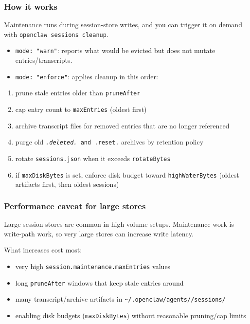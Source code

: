 \subsubsection{How it works}


Maintenance runs during session-store writes, and you can trigger it on demand with \texttt{openclaw sessions cleanup}.

\begin{itemize}
  \item \texttt{mode: "warn"}: reports what would be evicted but does not mutate entries/transcripts.
  \item \texttt{mode: "enforce"}: applies cleanup in this order:
\end{itemize}

\begin{enumerate}
  \item prune stale entries older than \texttt{pruneAfter}
  \item cap entry count to \texttt{maxEntries} (oldest first)
  \item archive transcript files for removed entries that are no longer referenced
  \item purge old \texttt{\textit{.deleted.} and \texttt{}.reset.} archives by retention policy
  \item rotate \texttt{sessions.json} when it exceeds \texttt{rotateBytes}
  \item if \texttt{maxDiskBytes} is set, enforce disk budget toward \texttt{highWaterBytes} (oldest artifacts first, then oldest sessions)
\end{enumerate}


\subsubsection{Performance caveat for large stores}


Large session stores are common in high-volume setups. Maintenance work is write-path work, so very large stores can increase write latency.

What increases cost most:

\begin{itemize}
  \item very high \texttt{session.maintenance.maxEntries} values
  \item long \texttt{pruneAfter} windows that keep stale entries around
  \item many transcript/archive artifacts in \texttt{\textasciitilde{}/.openclaw/agents//sessions/}
  \item enabling disk budgets (\texttt{maxDiskBytes}) without reasonable pruning/cap limits
\end{itemize}


